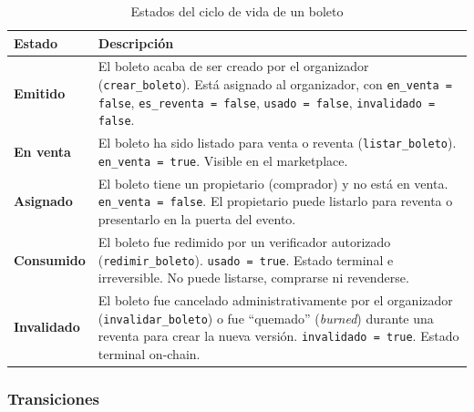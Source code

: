 \documentclass[12pt,oneside]{article}
\begin{document}
\begin{table}[h!]
  \centering
  \begin{tabularx}{\textwidth}{@{}p{3.5cm} X@{}}
    \toprule
    \textbf{Estado} & \textbf{Descripción}\\
    \midrule
    \textbf{Emitido} & El boleto acaba de ser creado por el organizador (\texttt{crear\_boleto}). Está asignado al organizador, con \texttt{en\_venta = false}, \texttt{es\_reventa = false}, \texttt{usado = false}, \texttt{invalidado = false}.\\
    \textbf{En venta} & El boleto ha sido listado para venta o reventa (\texttt{listar\_boleto}). \texttt{en\_venta = true}. Visible en el marketplace.\\
    \textbf{Asignado} & El boleto tiene un propietario (comprador) y no está en venta. \texttt{en\_venta = false}. El propietario puede listarlo para reventa o presentarlo en la puerta del evento.\\
    \textbf{Consumido} & El boleto fue redimido por un verificador autorizado (\texttt{redimir\_boleto}). \texttt{usado = true}. Estado terminal e irreversible. No puede listarse, comprarse ni revenderse.\\
    \textbf{Invalidado} & El boleto fue cancelado administrativamente por el organizador (\texttt{invalidar\_boleto}) o fue ``quemado'' (\textit{burned}) durante una reventa para crear la nueva versión. \texttt{invalidado = true}. Estado terminal on-chain.\\
    \bottomrule
  \end{tabularx}
  \caption{Estados del ciclo de vida de un boleto}
  \label{tab:estados-ticket}
\end{table}

\subsubsection{Transiciones}
\end{document}
